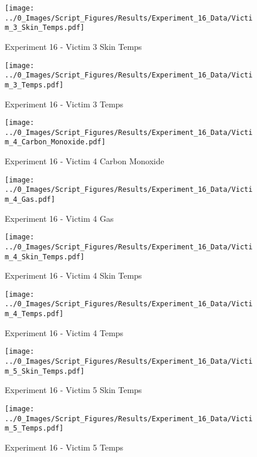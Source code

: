 	\begin{figure}[H]
		\centering
		\texttt{[image: ../0\_Images/Script\_Figures/Results/Experiment\_16\_Data/Victim\_3\_Skin\_Temps.pdf]}
		\caption[]{Experiment 16 - Victim 3 Skin Temps}
	\end{figure}
 
	\clearpage

	\begin{figure}[H]
		\centering
		\texttt{[image: ../0\_Images/Script\_Figures/Results/Experiment\_16\_Data/Victim\_3\_Temps.pdf]}
		\caption[]{Experiment 16 - Victim 3 Temps}
	\end{figure}
 

	\begin{figure}[H]
		\centering
		\texttt{[image: ../0\_Images/Script\_Figures/Results/Experiment\_16\_Data/Victim\_4\_Carbon\_Monoxide.pdf]}
		\caption[]{Experiment 16 - Victim 4 Carbon Monoxide}
	\end{figure}
 
	\clearpage

	\begin{figure}[H]
		\centering
		\texttt{[image: ../0\_Images/Script\_Figures/Results/Experiment\_16\_Data/Victim\_4\_Gas.pdf]}
		\caption[]{Experiment 16 - Victim 4 Gas}
	\end{figure}
 

	\begin{figure}[H]
		\centering
		\texttt{[image: ../0\_Images/Script\_Figures/Results/Experiment\_16\_Data/Victim\_4\_Skin\_Temps.pdf]}
		\caption[]{Experiment 16 - Victim 4 Skin Temps}
	\end{figure}
 
	\clearpage

	\begin{figure}[H]
		\centering
		\texttt{[image: ../0\_Images/Script\_Figures/Results/Experiment\_16\_Data/Victim\_4\_Temps.pdf]}
		\caption[]{Experiment 16 - Victim 4 Temps}
	\end{figure}
 

	\begin{figure}[H]
		\centering
		\texttt{[image: ../0\_Images/Script\_Figures/Results/Experiment\_16\_Data/Victim\_5\_Skin\_Temps.pdf]}
		\caption[]{Experiment 16 - Victim 5 Skin Temps}
	\end{figure}
 
	\clearpage

	\begin{figure}[H]
		\centering
		\texttt{[image: ../0\_Images/Script\_Figures/Results/Experiment\_16\_Data/Victim\_5\_Temps.pdf]}
		\caption[]{Experiment 16 - Victim 5 Temps}
	\end{figure}
 

